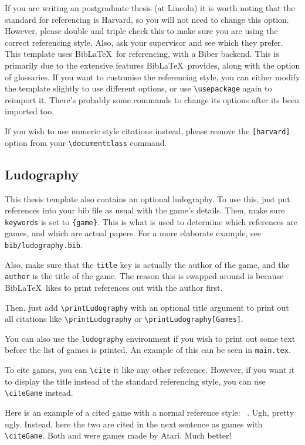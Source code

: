 If you are writing an postgraduate thesis (at Lincoln) it is worth noting that the standard for referencing is Harvard, so you will not need to change this option. However, please double and triple check this to make sure you are using the correct referencing style. Also, ask your supervisor and see which they prefer. This template uses Bib\LaTeX~for referencing, with a Biber backend. This is primarily due to the extensive features Bib\LaTeX~provides, along with the option of glossaries. If you want to customise the referencing style, you can either modify the template slightly to use different options, or use \texttt{\textbackslash usepackage} again to reimport it. There's probably some commands to change its options after its been imported too.

If you wish to use numeric style citations instead, please remove the \texttt{[harvard]} option from your \texttt{\textbackslash documentclass} command. 

\subsection{Ludography}
This thesis template also contains an optional ludography. To use this, just put references into your bib file as usual with the game's details. Then, make sure \texttt{keywords} is set to \texttt{\{game\}}. This is what is used to determine which references are games, and which are actual papers. For a more elaborate example, see \texttt{bib/ludography.bib}.

Also, make sure that the \texttt{title} key is actually the author of the game, and the \texttt{author} is the title of the game. The reason this is swapped around is because Bib\LaTeX~likes to print references out with the author first.

Then, just add \texttt{\textbackslash printLudography} with an optional title argument to print out all citations like \texttt{\textbackslash printLudography} or \texttt{\textbackslash printLudography[Games]}.

You can also use the \texttt{ludography} environment if you wish to print out some text before the list of games is printed. An example of this can be seen in \texttt{main.tex}.

To cite games, you can \texttt{\textbackslash cite} it like any other reference. However, if you want it to display the title instead of the standard referencing style, you can use \texttt{\textbackslash citeGame} instead.

Here is an example of a cited game with a normal reference style: ~\cite{spaceinvaders}. Ugh, pretty ugly. Instead, here the two are  cited in the next sentence as games with \texttt{\textbackslash citeGame}. Both  and  were games made by Atari. Much better!

